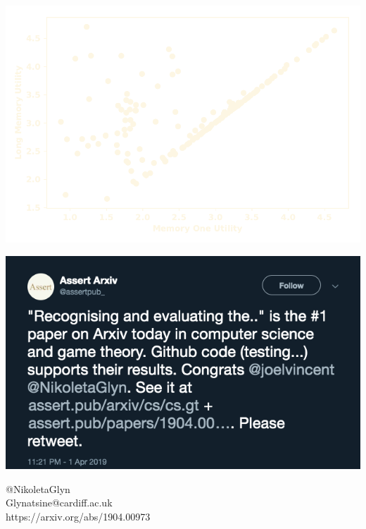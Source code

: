 \documentclass{beamer}
\begin{document}
\begin{frame}
    \begin{center}
        \hspace{-2cm}
        
    \end{center}
\end{frame}

\begin{frame}
    \begin{center}
        \includegraphics[width=\textwidth]{static/result_gambler}
    \end{center}
\end{frame}

\begin{frame}
    \begin{center}

        \hspace{-.7cm}
        
    \end{center}
\end{frame}

\begin{frame}
    \centering
    \includegraphics[width=.8\textwidth]{static/tweet}

    \vspace{.4cm}
    @NikoletaGlyn  \\ Glynatsine@cardiff.ac.uk \\

    \vspace{.3cm}
    \small{https://arxiv.org/abs/1904.00973}
\end{frame}
\end{document}
